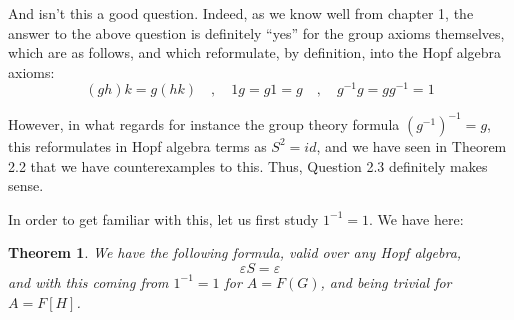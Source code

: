 \documentclass[12pt]{amsbook}
\newtheorem{theorem}{Theorem}[chapter]
\begin{document}
And isn't this a good question. Indeed, as we know well from chapter 1, the answer to the above question is definitely ``yes'' for the group axioms themselves, which are as follows, and which reformulate, by definition, into the Hopf algebra axioms:
$$(gh)k=g(hk)\quad,\quad 1g=g1=g\quad,\quad g^{-1}g=gg^{-1}=1$$

However, in what regards for instance the group theory formula $(g^{-1})^{-1}=g$, this reformulates in Hopf algebra terms as $S^2=id$, and we have seen in Theorem 2.2 that we have counterexamples to this. Thus, Question 2.3 definitely makes sense.

\bigskip

In order to get familiar with this, let us first study $1^{-1}=1$. We have here:

\begin{theorem}
We have the following formula, valid over any Hopf algebra,
$$\varepsilon S=\varepsilon$$
and with this coming from $1^{-1}=1$ for $A=F(G)$, and being trivial for $A=F[H]$.
\end{theorem}
\end{document}

